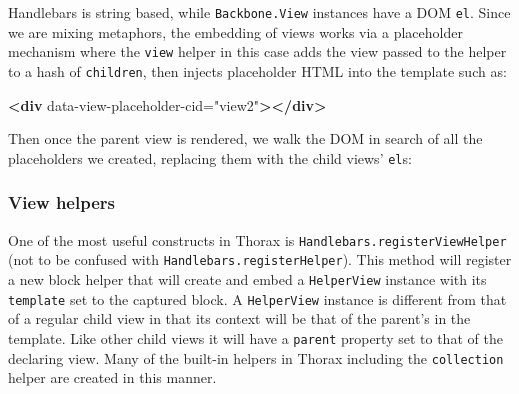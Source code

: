\documentclass[9pt]{book}
\newenvironment{Shaded}{}{}
\newcommand{\KeywordTok}[1]{\textcolor[rgb]{0.00,0.44,0.13}{\textbf{{#1}}}}
\newcommand{\StringTok}[1]{\textcolor[rgb]{0.25,0.44,0.63}{{#1}}}
\newcommand{\OtherTok}[1]{\textcolor[rgb]{0.00,0.44,0.13}{{#1}}}
\newcommand{\FunctionTok}[1]{\textcolor[rgb]{0.02,0.16,0.49}{{#1}}}
\newcommand{\NormalTok}[1]{{#1}}
\begin{document}
Handlebars is string based, while \texttt{Backbone.View} instances have
a DOM \texttt{el}. Since we are mixing metaphors, the embedding of views
works via a placeholder mechanism where the \texttt{view} helper in this
case adds the view passed to the helper to a hash of \texttt{children},
then injects placeholder HTML into the template such as:

\begin{Shaded}
\begin{Highlighting}[]
    \KeywordTok{<div}\OtherTok{ data-view-placeholder-cid=}\StringTok{"view2"}\KeywordTok{></div>}
\end{Highlighting}
\end{Shaded}

Then once the parent view is rendered, we walk the DOM in search of all
the placeholders we created, replacing them with the child views'
\texttt{el}s:

\begin{Shaded}
\end{Shaded}

\subsubsection{View helpers}\label{view-helpers}

One of the most useful constructs in Thorax is
\texttt{Handlebars.registerViewHelper} (not to be confused with
\texttt{Handlebars.registerHelper}). This method will register a new
block helper that will create and embed a \texttt{HelperView} instance
with its \texttt{template} set to the captured block. A
\texttt{HelperView} instance is different from that of a regular child
view in that its context will be that of the parent's in the template.
Like other child views it will have a \texttt{parent} property set to
that of the declaring view. Many of the built-in helpers in Thorax
including the \texttt{collection} helper are created in this manner.
\end{document}
